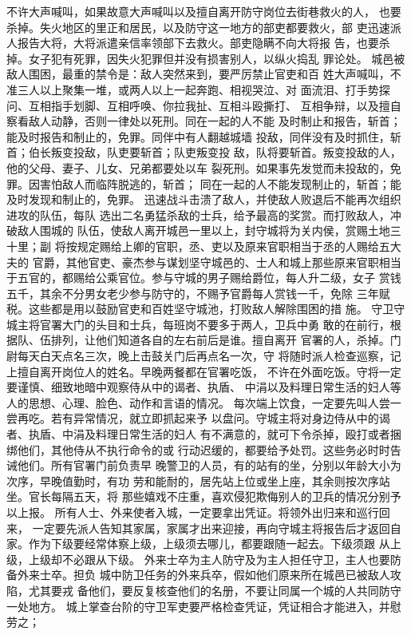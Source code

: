 \documentclass[12pt,UTF8]{ctexbook}
\begin{document}
不许大声喊叫，如果故意大声喊叫以及擅自离开防守岗位去街巷救火的人， 
也要杀掉。失火地区的里正和居民，以及防守这一地方的部吏都要救火，部 
吏迅速派人报告大将，大将派遣亲信率领部下去救火。部吏隐瞒不向大将报 
告，也要杀掉。女子犯有死罪，因失火犯罪但并没有损害别人，以纵火捣乱 
罪论处。 
城邑被敌人围困，最重的禁令是：敌人突然来到，要严厉禁止官吏和百 
姓大声喊叫，不准三人以上聚集一堆，或两人以上一起奔跑、相视哭泣、对 
面流泪、打手势探问、互相指手划脚、互相呼唤、你拉我扯、互相斗殴撕打、 
互相争辩，以及擅自察看敌人动静，否则一律处以死刑。同在一起的人不能 
及时制止和报告，斩首；能及时报告和制止的，免罪。同伴中有人翻越城墙 
投敌，同伴没有及时抓住，斩首；伯长叛变投敌，队吏要斩首；队吏叛变投 
敌，队将要斩首。叛变投敌的人，他的父母、妻子、儿女、兄弟都要处以车 
裂死刑。如果事先发觉而未投敌的，免罪。因害怕敌人而临阵脱逃的，斩首； 
同在一起的人不能发现制止的，斩首；能及时发现和制止的，免罪。 
迅速战斗击溃了敌人，并使敌人败退后不能再次组织进攻的队伍，每队 
选出二名勇猛杀敌的士兵，给予最高的奖赏。而打败敌人，冲破敌人围城的 
队伍，使敌人离开城邑一里以上，封守城将为关内侯，赏赐土地三十里；副 
将按规定赐给上卿的官职，丞、吏以及原来官职相当于丞的人赐给五大夫的 
官爵，其他官吏、豪杰参与谋划坚守城邑的、士人和城上那些原来官职相当 
于五官的，都赐给公乘官位。参与守城的男子赐给爵位，每人升二级，女子 
赏钱五千，其余不分男女老少参与防守的，不赐予官爵每人赏钱一千，免除 
三年赋税。这些都是用以鼓励官吏和百姓坚守城池，打败敌人解除围困的措 
施。 
守卫守城主将官署大门的头目和士兵，每班岗不要多于两人，卫兵中勇 
敢的在前行，根据队、伍排列，让他们知道各自的左右前后是谁。擅自离开 
官署的人，杀掉。门尉每天白天点名三次，晚上击鼓关门后再点名一次，守 
将随时派人检查巡察，记上擅自离开岗位人的姓名。早晚两餐都在官署吃饭， 
不许在外面吃饭。守将一定要谨慎、细致地暗中观察侍从中的谒者、执盾、 
中涓以及料理日常生活的妇人等人的思想、心理、脸色、动作和言语的情况。 
每次端上饮食，一定要先叫人尝一尝再吃。若有异常情况，就立即抓起来予 
以盘问。守城主将对身边侍从中的谒者、执盾、中涓及料理日常生活的妇人 
有不满意的，就可下令杀掉，殴打或者捆绑他们，其他侍从不执行命令的或 
行动迟缓的，都要给予处罚。这些务必时时告诫他们。所有官署门前负责早 
晚警卫的人员，有的站有的坐，分别以年龄大小为次序，早晚值勤时，有功 
劳和能耐的，居先站上位或坐上座，其余则按次序站坐。官长每隔五天，将 
那些嬉戏不庄重，喜欢侵犯欺侮别人的卫兵的情况分别予以上报。 
所有人士、外来使者入城，一定要拿出凭证。将领外出归来和巡行回来， 
一定要先派人告知其家属，家属才出来迎接，再向守城主将报告后才返回自 
家。作为下级要经常体察上级，上级须去哪儿，都要跟随一起去。下级须跟 
从上级，上级却不必跟从下级。 
外来士卒为主人防守及为主人担任守卫，主人也要防备外来士卒。担负 
城中防卫任务的外来兵卒，假如他们原来所在城邑已被敌人攻陷，尤其要戎 
备他们，要反复核查他们的名册，不要让同属一个城的人共同防守一处地方。 
城上掌查台阶的守卫军吏要严格检查凭证，凭证相合才能进入，并慰劳之； 
\end{document}
